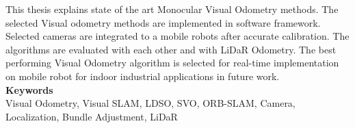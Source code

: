 \noindent
\normalsize
This thesis explains state of the art Monocular Visual Odometry methods. The selected Visual odometry methods are implemented in software framework. Selected cameras are integrated to a mobile robots after accurate calibration. The algorithms are evaluated with each other and with LiDaR Odometry. The best performing Visual Odometry algorithm is selected for real-time implementation on mobile robot for indoor industrial applications in future work.  \\


\vspace{13pt}
\noindent\huge\textbf{Keywords} \\
\vspace{13pt}
\normalsize
\newline
Visual Odometry, Visual SLAM, LDSO, SVO, ORB-SLAM, Camera, Localization, Bundle Adjustment, LiDaR